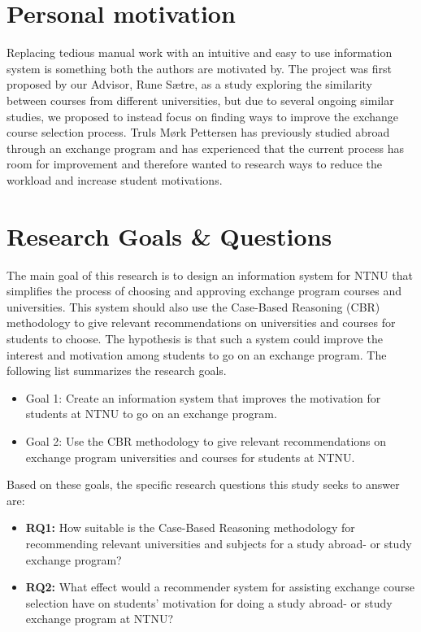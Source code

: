 \section{Personal motivation}
Replacing tedious manual work with an intuitive and easy to use information system is something both the authors are motivated by. The project was first proposed by our Advisor, Rune Sætre, as a study exploring the similarity between courses from different universities, but due to several ongoing similar studies, we proposed to instead focus on finding ways to improve the exchange course selection process. Truls Mørk Pettersen has previously studied abroad through an exchange program and has experienced that the current process has room for improvement and therefore wanted to research ways to reduce the workload and increase student motivations.

\section{Research Goals \& Questions}\label{RQ}
The main goal of this research is to design an information system for NTNU that simplifies the process of choosing and approving exchange program courses and universities. This system should also use the Case-Based Reasoning (CBR) methodology to give relevant recommendations on universities and courses for students to choose. The hypothesis is that such a system could improve the interest and motivation among students to go on an exchange program. The following list summarizes the research goals.

\begin{itemize}[noitemsep]
    \item Goal 1: Create an information system that improves the motivation for students at NTNU to go on an exchange program.
    \item Goal 2: Use the CBR methodology to give relevant recommendations on exchange program universities and courses for students at NTNU.
\end{itemize}

Based on these goals, the specific research questions this study seeks to answer are:

\begin{itemize}
    \item \textbf{RQ1:} How suitable is the Case-Based Reasoning methodology for recommending relevant universities and subjects for a study abroad- or study exchange program?
    \item \textbf{RQ2:} What effect would a recommender system for assisting exchange course selection have on students' motivation for doing a study abroad- or study exchange program at NTNU?
\end{itemize}


